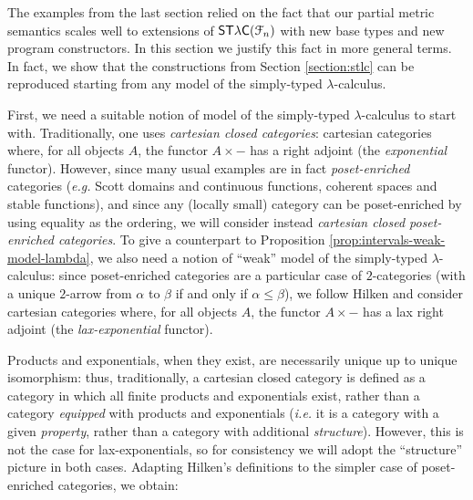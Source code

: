 The examples from the last section relied on the fact that our partial metric semantics scales well to extensions of $\mathsf{ST\lambda C}(\mathcal F_{n})$ with new base types and new program constructors. In this section we justify this fact in more general terms. In fact, we show that the constructions from Section \ref{section:stlc} can be reproduced starting from any model of the simply-typed $\lambda$-calculus. 


First, we need a suitable notion of model of the simply-typed $\lambda$-calculus to start with. Traditionally, one uses \emph{cartesian closed categories}: cartesian categories where, for all objects $A$, the functor $A \times -$ has a right adjoint (the \emph{exponential} functor). However, since many usual examples are in fact \emph{poset-enriched} categories (\textit{e.g.} Scott domains and continuous functions, coherent spaces and stable functions), and since any (locally small) category can be poset-enriched by using equality as the ordering, we will consider instead \emph{cartesian closed poset-enriched categories}. To give a counterpart to Proposition \ref{prop:intervals-weak-model-lambda}, we also need a notion of ``weak'' model of the simply-typed $\lambda$-calculus: since poset-enriched categories are a particular case of $2$-categories (with a unique $2$-arrow from $\alpha$ to $\beta$ if and only if $\alpha \leq \beta$), we follow Hilken \cite{hilken:2-lambda} and consider cartesian categories where, for all objects $A$, the functor $A \times -$ has a lax right adjoint (the \emph{lax-exponential} functor).

Products and exponentials, when they exist, are necessarily unique up to unique isomorphism: thus, traditionally, a cartesian closed category is defined as a category in which all finite products and exponentials exist, rather than a category \emph{equipped} with products and exponentials (\textit{i.e.} it is a category with a given \emph{property}, rather than a category with additional \emph{structure}). However, this is not the case for lax-exponentials, so for consistency we will adopt the ``structure'' picture in both cases. Adapting Hilken's definitions \cite{hilken:2-lambda} to the simpler case of poset-enriched categories, we obtain:

